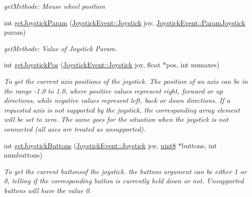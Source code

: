 \begin{DoxyCompactItemize}
\begin{DoxyCompactList}\small\item\em getMethode: Mouse wheel position \item\end{DoxyCompactList}\item 
int \hyperlink{class_f2_c_1_1_input_ad2b10c018d3a0059dcfc7325de011d45}{getJoystickParam} (\hyperlink{namespace_f2_c_1_1_joystick_event_ada0230f460f765718db17ac021cbfc1f}{JoystickEvent::Joystick} joy, \hyperlink{namespace_f2_c_1_1_joystick_event_ae71fc0f92f6dd24cc1ffe1bd14b6ed82}{JoystickEvent::ParamJoystick} param)
\begin{DoxyCompactList}\small\item\em getMethode: Value of Joystick Param. \item\end{DoxyCompactList}\item 
int \hyperlink{class_f2_c_1_1_input_a4638b65b4be2c3c5254531b6e0e54a9b}{getJoystickPos} (\hyperlink{namespace_f2_c_1_1_joystick_event_ada0230f460f765718db17ac021cbfc1f}{JoystickEvent::Joystick} joy, float $\ast$pos, int numaxes)
\begin{DoxyCompactList}\small\item\em To get the current axis positions of the joystick. The position of an axis can be in the range -\/1.0 to 1.0, where positive values represent right, forward or up directions, while negative values represent left, back or down directions. If a requested axis is not supported by the joystick, the corresponding array element will be set to zero. The same goes for the situation when the joystick is not connected (all axes are treated as unsupported). \item\end{DoxyCompactList}\item 
int \hyperlink{class_f2_c_1_1_input_a1049f8515c9466de7635cc230bdd5a27}{getJoystickButtons} (\hyperlink{namespace_f2_c_1_1_joystick_event_ada0230f460f765718db17ac021cbfc1f}{JoystickEvent::Joystick} joy, \hyperlink{namespace_f2_c_a711deb33697d145669b9c0c4fe87c7ca}{uint8} $\ast$buttons, int numbuttons)
\begin{DoxyCompactList}\small\item\em To get the current buttonsof the joystick. the buttons argument can be either 1 or 0, telling if the corresponding button is currently held down or not. Unsupported buttons will have the value 0. \item\end{DoxyCompactList}\item 

\end{DoxyCompactItemize}
